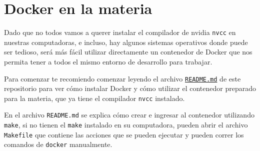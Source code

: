 \section{Docker en la materia}

Dado que no todos vamos a querer instalar el compilador de nvidia \texttt{nvcc} en nuestras computadoras, e incluso, hay
algunos sistemas operativos donde puede ser tedioso, será más fácil utilizar directamente un contenedor de Docker que
nos permita tener a todos el mismo entorno de desarrollo para trabajar.

Para comenzar te recomiendo comenzar leyendo el archivo
\href{https://github.com/felixcuello/up-materias/blob/main/programacion_paralela/docker/README.md}{\texttt{README.md}}
de este repositorio para ver cómo instalar Docker y cómo utilizar el contenedor preparado para la materia, que ya tiene
el compilador \texttt{nvcc} instalado.

En el archivo \texttt{README.md} se explica cómo crear e ingresar al contenedor utilizando \texttt{make}, si no tienen
el \texttt{make} instalado en su computadora, pueden abrir el archivo \texttt{Makefile} que contiene las acciones que se
pueden ejecutar y pueden correr los comandos de \texttt{docker} manualmente.




